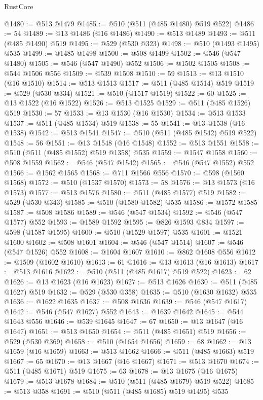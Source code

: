 \begin{lexlean}{RustCore}
\begin{coremodule}
@1480 := @513 @1479
@1485 := @510 (@511 (@485 @1480) @519 @522)
@1486 := 54
@1489 := @13 @1486 (@16 @1486)
@1490 := @513 @1489
@1493 := @511 (@485 @1490) @519
@1495 := @529 (@530 @323)
@1498 := @510 (@1493 @1495) @535
@1499 := @1485 @1498
@1500 := @508 @1499
@1502 := @546 (@547 @1480)
@1505 := @546 (@547 @1490) @552
@1506 := @1502 @1505
@1508 := @544 @1506 @556
@1509 := @539 @1508
@1510 := 59
@1513 := @13 @1510 (@16 @1510)
@1514 := @513 @1513
@1517 := @511 (@485 @1514) @519
@1519 := @529 (@530 @334)
@1521 := @510 (@1517 @1519)
@1522 := 60
@1525 := @13 @1522 (@16 @1522)
@1526 := @513 @1525
@1529 := @511 (@485 @1526) @519
@1530 := 57
@1533 := @13 @1530 (@16 @1530)
@1534 := @513 @1533
@1537 := @511 (@485 @1534) @519
@1538 := 55
@1541 := @13 @1538 (@16 @1538)
@1542 := @513 @1541
@1547 := @510 (@511 (@485 @1542) @519 @522)
@1548 := 56
@1551 := @13 @1548 (@16 @1548)
@1552 := @513 @1551
@1558 := @510 (@511 (@485 @1552) @519 @1358) @535
@1559 := @1547 @1558
@1560 := @508 @1559
@1562 := @546 (@547 @1542)
@1565 := @546 (@547 @1552) @552
@1566 := @1562 @1565
@1568 := @711 @1566 @556
@1570 := @598 (@1560 @1568)
@1572 := @510 (@1537 @1570)
@1573 := 58
@1576 := @13 @1573 (@16 @1573)
@1577 := @513 @1576
@1580 := @511 (@485 @1577) @519
@1582 := @529 (@530 @343)
@1585 := @510 (@1580 @1582) @535
@1586 := @1572 @1585
@1587 := @508 @1586
@1589 := @546 (@547 @1534)
@1592 := @546 (@547 @1577) @552
@1593 := @1589 @1592
@1595 := @826 @1593 @834
@1597 := @598 (@1587 @1595)
@1600 := @510 (@1529 @1597) @535
@1601 := @1521 @1600
@1602 := @508 @1601
@1604 := @546 (@547 @1514)
@1607 := @546 (@547 @1526) @552
@1608 := @1604 @1607
@1610 := @862 @1608 @556
@1612 := @1509 (@1602 @1610)
@1613 := 61
@1616 := @13 @1613 (@16 @1613)
@1617 := @513 @1616
@1622 := @510 (@511 (@485 @1617) @519 @522)
@1623 := 62
@1626 := @13 @1623 (@16 @1623)
@1627 := @513 @1626
@1630 := @511 (@485 @1627) @519
@1632 := @529 (@530 @358)
@1635 := @510 (@1630 @1632) @535
@1636 := @1622 @1635
@1637 := @508 @1636
@1639 := @546 (@547 @1617)
@1642 := @546 (@547 @1627) @552
@1643 := @1639 @1642
@1645 := @544 @1643 @556
@1646 := @539 @1645
@1647 := 67
@1650 := @13 @1647 (@16 @1647)
@1651 := @513 @1650
@1654 := @511 (@485 @1651) @519
@1656 := @529 (@530 @369)
@1658 := @510 (@1654 @1656)
@1659 := 68
@1662 := @13 @1659 (@16 @1659)
@1663 := @513 @1662
@1666 := @511 (@485 @1663) @519
@1667 := 65
@1670 := @13 @1667 (@16 @1667)
@1671 := @513 @1670
@1674 := @511 (@485 @1671) @519
@1675 := 63
@1678 := @13 @1675 (@16 @1675)
@1679 := @513 @1678
@1684 := @510 (@511 (@485 @1679) @519 @522)
@1685 := @513 @358
@1691 := @510 (@511 (@485 @1685) @519 @1495) @535

\end{coremodule}
\end{lexlean}
